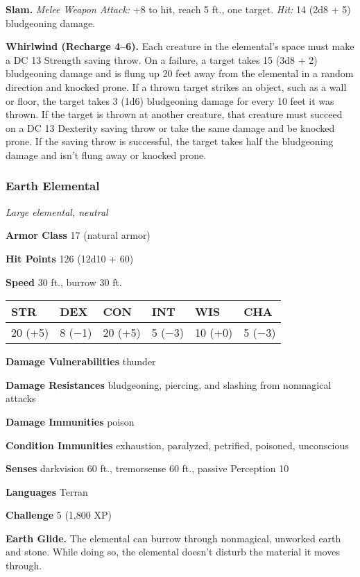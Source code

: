 \documentclass[
]{article}
\begin{document}
\textbf{Slam.} \emph{Melee Weapon Attack:} +8 to hit, reach 5 ft., one
target. \emph{Hit:} 14 (2d8 + 5) bludgeoning damage.

\textbf{Whirlwind (Recharge 4--6).} Each creature in the elemental's
space must make a DC 13 Strength saving throw. On a failure, a target
takes 15 (3d8 + 2) bludgeoning damage and is flung up 20 feet away from
the elemental in a random direction and knocked prone. If a thrown
target strikes an object, such as a wall or floor, the target takes 3
(1d6) bludgeoning damage for every 10 feet it was thrown. If the target
is thrown at another creature, that creature must succeed on a DC 13
Dexterity saving throw or take the same damage and be knocked prone. If
the saving throw is successful, the target takes half the bludgeoning
damage and isn't flung away or knocked prone.

\hypertarget{earth-elemental}{%
\subsubsection{Earth Elemental}\label{earth-elemental}}

\emph{Large elemental, neutral}

\textbf{Armor Class} 17 (natural armor)

\textbf{Hit Points} 126 (12d10 + 60)

\textbf{Speed} 30 ft., burrow 30 ft.

\begin{longtable}[]{@{}llllll@{}}
\toprule
STR & DEX & CON & INT & WIS & CHA\tabularnewline
\midrule
\endhead
20 (+5) & 8 (−1) & 20 (+5) & 5 (−3) & 10 (+0) & 5 (−3)\tabularnewline
\bottomrule
\end{longtable}

\textbf{Damage Vulnerabilities} thunder

\textbf{Damage Resistances} bludgeoning, piercing, and slashing from
nonmagical attacks

\textbf{Damage Immunities} poison

\textbf{Condition Immunities} exhaustion, paralyzed, petrified,
poisoned, unconscious

\textbf{Senses} darkvision 60 ft., tremorsense 60 ft., passive
Perception 10

\textbf{Languages} Terran

\textbf{Challenge} 5 (1,800 XP)

\textbf{Earth Glide.} The elemental can burrow through nonmagical,
unworked earth and stone. While doing so, the elemental doesn't disturb
the material it moves through.
\end{document}
